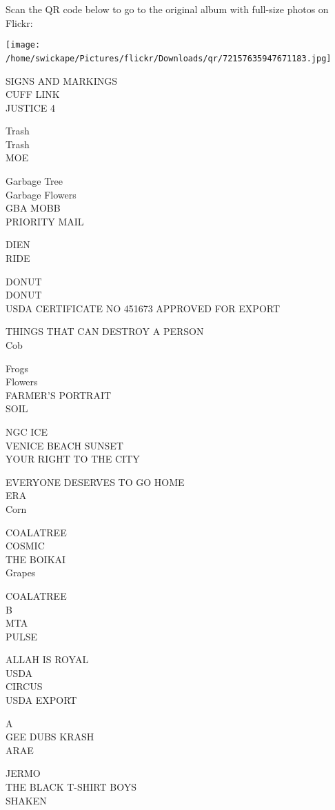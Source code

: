 \documentclass[10pt,letterpaper]{article}
\begin{document}
Scan the QR code below to go to the original album with full-size photos on Flickr:

\texttt{[image: /home/swickape/Pictures/flickr/Downloads/qr/72157635947671183.jpg]}
\

SIGNS AND MARKINGS\\
CUFF LINK\\
JUSTICE 4

Trash\\
Trash\\
MOE

Garbage Tree\\
Garbage Flowers\\
GBA MOBB\\
PRIORITY MAIL

DIEN\\
RIDE

DONUT\\
DONUT\\
USDA CERTIFICATE NO 451673 APPROVED FOR EXPORT

THINGS THAT CAN DESTROY A PERSON\\
Cob

Frogs\\
Flowers\\
FARMER'S PORTRAIT\\
SOIL

NGC ICE\\
VENICE BEACH SUNSET\\
YOUR RIGHT TO THE CITY

EVERYONE DESERVES TO GO HOME\\
ERA\\
Corn

COALATREE\\
COSMIC\\
THE BOIKAI\\
Grapes

COALATREE\\
B\\
MTA\\
PULSE

ALLAH IS ROYAL\\
USDA\\
CIRCUS\\
USDA EXPORT

A\\
GEE DUBS KRASH\\
ARAE

JERMO\\
THE BLACK T{-}SHIRT BOYS\\
SHAKEN
\end{document}
